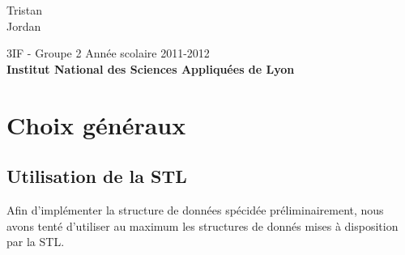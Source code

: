 \documentclass[a4paper,french,10pt,twoside]{article}
\begin{document}
\vspace*{5cm}

\setlength\fboxrule{2pt}

\vspace{1cm}

\begin{center}
  \Large \textbf{}\\
\end{center}

\begin{center}
	\vspace*{3cm}
	\LARGE {}\\ \vspace{10pt}\large \color{black} Tristan  \\ Jordan  \\
				   \vspace*{1.5cm}

				   \vspace*{1cm}

				   \Large 3IF - Groupe 2 \hfill Ann\'ee scolaire 2011-2012\\
				   \vspace*{1cm}
				   \textbf{\Large Institut National des Sciences Appliqu\'{e}es de Lyon} \pagebreak
\end{center}

\section{Choix g\'en\'eraux}

\subsection{Utilisation de la STL}
Afin d'impl\'ementer la structure de donn\'ees sp\'ecid\'ee pr\'eliminairement,
nous avons tent\'e d'utiliser au maximum les structures de donn\'es mises à disposition par la STL.
\end{document}
